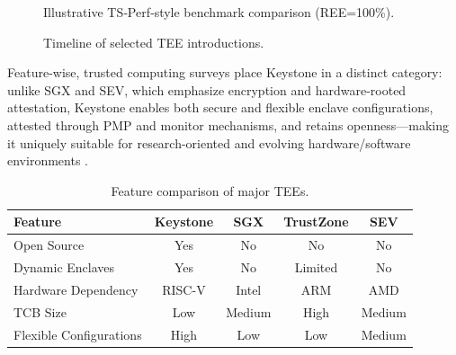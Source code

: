 \begin{figure}[htbp]
\centering
{}
\caption{Illustrative TS‑Perf‑style benchmark comparison (REE=100\%).}
\label{fig:bench-compare}
\end{figure}

\begin{figure}[htbp]
\centering
{}
\caption{Timeline of selected TEE introductions.}
\label{fig:tee-timeline}
\end{figure}

Feature-wise, trusted computing surveys place Keystone in a distinct category: unlike SGX and SEV, which emphasize encryption and hardware-rooted attestation, Keystone enables both secure and flexible enclave configurations, attested through PMP and monitor mechanisms, and retains openness—making it uniquely suitable for research-oriented and evolving hardware/software environments \cite{turn0search9}.

\begin{table}[htbp]
\centering
\caption{Feature comparison of major TEEs.}
\label{tab:tee-features}
\begin{tabular}{@{}lcccc@{}}
\toprule
Feature & Keystone & SGX & TrustZone & SEV \\
\midrule
Open Source & Yes & No & No & No \\
Dynamic Enclaves & Yes & No & Limited & No \\
Hardware Dependency & RISC-V & Intel & ARM & AMD \\
TCB Size & Low & Medium & High & Medium \\
Flexible Configurations & High & Low & Low & Medium \\
\bottomrule
\end{tabular}
\end{table}


